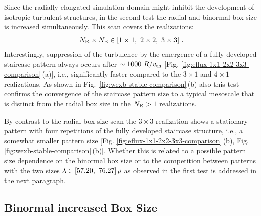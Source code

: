 Since the radially elongated simulation domain might inhibit the development of isotropic turbulent structures, in the second test the radial and binormal box size is increased simultaneously.
This scan covers the realizations:
\begin{gather*}
	N_\mathrm{R}\times N_\mathrm{B} \in [1\times1,~2\times2,~3\times3]~.
\end{gather*}
Interestingly, suppression of the turbulence by the emergence of a fully developed staircase pattern always occurs after $\sim 1000~R/v_{\mathrm{th}}$ [Fig. \ref{fig:eflux-1x1-2x2-3x3-comparison}\,(a)], i.e., significantly faster compared to the $3\times1$ and $4\times1$ realizations. 
%
As shown in Fig.~\ref{fig:wexb-stable-comparison}\,(b) also this test confirms the convergence of the staircase pattern size to a typical mesoscale that is distinct from the radial box size in the $N_\mathrm{R} > 1$ realizations.


By contrast to the radial box size scan the $3\times3$ realization shows a stationary pattern with four repetitions of the fully developed staircase structure, i.e., a somewhat smaller pattern size [Fig. \ref{fig:eflux-1x1-2x2-3x3-comparison}\,(b), Fig. \ref{fig:wexb-stable-comparison}\,(b)]. 
Whether this is related to a possible pattern size dependence on the binormal box size or to the competition between patterns with the two sizes $\lambda \in [57.20,~ 76.27]\,\rho$ as observed in the first test is addressed in the next paragraph.

\newpage
\subsection{Binormal increased Box Size}
\label{sub:binormal}


